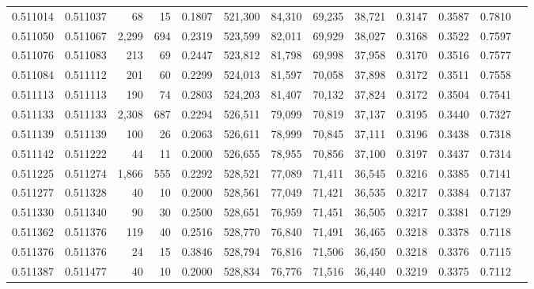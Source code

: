 \begin{tabular}{rrrrrrrrrrrrr}
0.511014 & 0.511037 &    68 &    15 &                                     0.1807 & 521,300 &  84,310 &  69,235 &  38,721 & 0.3147 & 0.3587 & 0.7810 \\
0.511050 & 0.511067 & 2,299 &   694 &                                     0.2319 & 523,599 &  82,011 &  69,929 &  38,027 & 0.3168 & 0.3522 & 0.7597 \\
0.511076 & 0.511083 &   213 &    69 &                                     0.2447 & 523,812 &  81,798 &  69,998 &  37,958 & 0.3170 & 0.3516 & 0.7577 \\
0.511084 & 0.511112 &   201 &    60 &                                     0.2299 & 524,013 &  81,597 &  70,058 &  37,898 & 0.3172 & 0.3511 & 0.7558 \\
0.511113 & 0.511113 &   190 &    74 &                                     0.2803 & 524,203 &  81,407 &  70,132 &  37,824 & 0.3172 & 0.3504 & 0.7541 \\
0.511133 & 0.511133 & 2,308 &   687 &                                     0.2294 & 526,511 &  79,099 &  70,819 &  37,137 & 0.3195 & 0.3440 & 0.7327 \\
0.511139 & 0.511139 &   100 &    26 &                                     0.2063 & 526,611 &  78,999 &  70,845 &  37,111 & 0.3196 & 0.3438 & 0.7318 \\
0.511142 & 0.511222 &    44 &    11 &                                     0.2000 & 526,655 &  78,955 &  70,856 &  37,100 & 0.3197 & 0.3437 & 0.7314 \\
0.511225 & 0.511274 & 1,866 &   555 &                                     0.2292 & 528,521 &  77,089 &  71,411 &  36,545 & 0.3216 & 0.3385 & 0.7141 \\
0.511277 & 0.511328 &    40 &    10 &                                     0.2000 & 528,561 &  77,049 &  71,421 &  36,535 & 0.3217 & 0.3384 & 0.7137 \\
0.511330 & 0.511340 &    90 &    30 &                                     0.2500 & 528,651 &  76,959 &  71,451 &  36,505 & 0.3217 & 0.3381 & 0.7129 \\
0.511362 & 0.511376 &   119 &    40 &                                     0.2516 & 528,770 &  76,840 &  71,491 &  36,465 & 0.3218 & 0.3378 & 0.7118 \\
0.511376 & 0.511376 &    24 &    15 &                                     0.3846 & 528,794 &  76,816 &  71,506 &  36,450 & 0.3218 & 0.3376 & 0.7115 \\
0.511387 & 0.511477 &    40 &    10 &                                     0.2000 & 528,834 &  76,776 &  71,516 &  36,440 & 0.3219 & 0.3375 & 0.7112 \\

\end{tabular}
